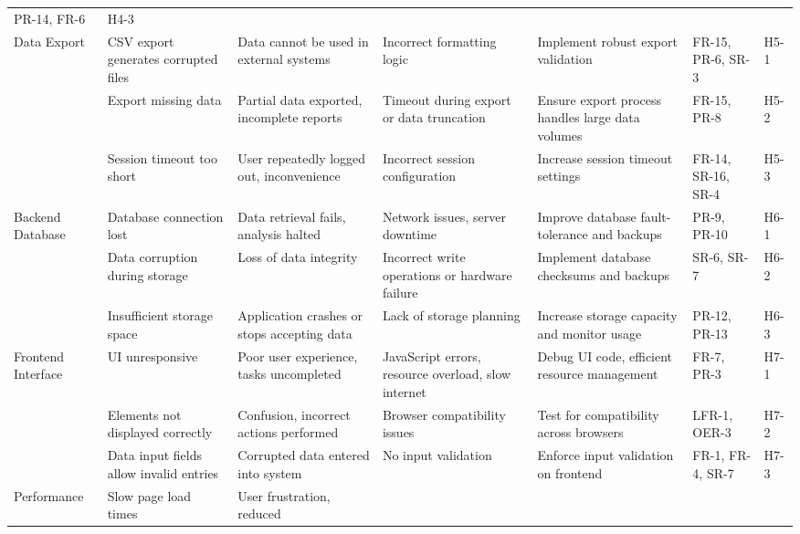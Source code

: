 \documentclass{article}
\begin{document}
\begin{landscape}
\begin{longtable}{|p{2.5cm}|p{4cm}|p{4cm}|p{4cm}|p{4cm}|p{1.25cm}|p{1cm}|}
        PR-14, FR-6 & H4-3 \\
        \cline{1-7}
        Data Export & CSV export generates corrupted files & Data cannot be used
        in external systems & Incorrect formatting logic & Implement robust
        export validation & FR-15, PR-6, SR-3 & H5-1 \\
        \cline{2-7}
        \texttt{} & Export missing data & Partial data exported, incomplete
        reports & Timeout during export or data truncation & Ensure export
        process handles large data volumes & FR-15, PR-8 & H5-2 \\
        \cline{2-7}
        \texttt{} & Session timeout too short & User repeatedly logged out,
        inconvenience & Incorrect session configuration & Increase session
        timeout settings & FR-14, SR-16, SR-4 & H5-3 \\
        \cline{1-7}
        Backend Database & Database connection lost & Data retrieval fails,
        analysis halted & Network issues, server downtime & Improve database
        fault-tolerance and backups & PR-9, PR-10 & H6-1 \\
        \cline{2-7}
        \texttt{} & Data corruption during storage & Loss of data integrity &
        Incorrect write operations or hardware failure & Implement database
        checksums and backups & SR-6, SR-7 & H6-2 \\
        \cline{2-7}
        \texttt{} & Insufficient storage space & Application crashes or stops
        accepting data & Lack of storage planning & Increase storage capacity
        and monitor usage & PR-12, PR-13 & H6-3 \\
        \cline{1-7}
        Frontend Interface & UI unresponsive & Poor user experience, tasks
        uncompleted & JavaScript errors, resource overload, slow internet &
        Debug UI code, efficient resource management & FR-7, PR-3 & H7-1 \\
        \cline{2-7}
        \texttt{} & Elements not displayed correctly & Confusion, incorrect
        actions performed & Browser compatibility issues & Test for
        compatibility across browsers & LFR-1, OER-3 & H7-2 \\
        \cline{2-7}
        \texttt{} & Data input fields allow invalid entries & Corrupted data
        entered into system & No input validation & Enforce input validation on
        frontend & FR-1, FR-4, SR-7 & H7-3 \\
        \cline{1-7}
        Performance & Slow page load times & User frustration, reduced

\end{longtable}
\end{landscape}
\end{document}
